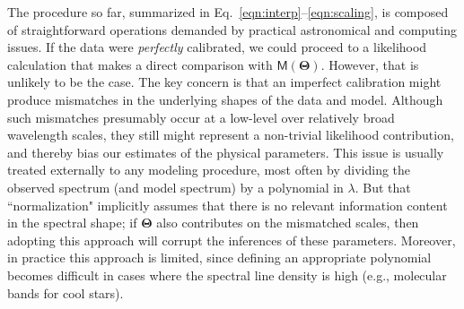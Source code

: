 \documentclass[iop,floatfix,numberedappendix,twocolappendix]{emulateapj}
\newcommand{\vM}{\mathsf{M}}
\newcommand{\vT}{ {\bm \Theta}}
\begin{document}
The procedure so far, summarized in Eq.~\ref{eqn:interp}--\ref{eqn:scaling}, is composed of 
straightforward operations demanded by practical astronomical and computing issues.  If the data 
were {\it perfectly} calibrated, we could proceed to a likelihood calculation that makes a direct 
comparison with $\vM(\vT)$.  However, that is unlikely to be the case.  The key concern is that an 
imperfect calibration might produce mismatches in the underlying shapes of the data and model.  
Although such mismatches presumably occur at a low-level over relatively broad wavelength scales, 
they still might represent a non-trivial likelihood contribution, and thereby bias our estimates of 
the physical parameters.  This issue is usually treated externally to any modeling procedure, most 
often by dividing the observed spectrum (and model spectrum) by a polynomial in $\lambda$.  But 
that ``normalization" implicitly assumes that there is no relevant information content in the 
spectral shape; if $\vT$ also contributes on the mismatched scales, then adopting this approach 
will corrupt the inferences of these parameters.  Moreover, in practice this approach is limited, 
since defining an appropriate polynomial becomes difficult in cases where the spectral line density 
is high (e.g., molecular bands for cool stars).  
\end{document}
